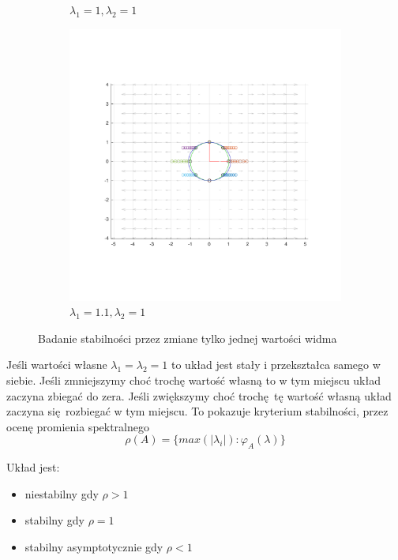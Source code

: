 \documentclass[]{article}
\begin{document}
\begin{figure}[H]
\begin{subfigure}{.5\textwidth}
		\caption{$\lambda_1 = 1, \lambda_2 = 1 $}
		\label{fig:const2}
	\end{subfigure}%
	\begin{subfigure}{.5\textwidth}
		\centering
		\includegraphics[width=0.99\linewidth]{const_11}
		\caption{$\lambda_1 = 1.1, \lambda_2 = 1 $}
		\label{fig:const3}
	\end{subfigure}%
	\caption{Badanie stabilności przez zmiane tylko jednej wartości widma}
	\label{figcons2}
\end{figure}

Jeśli wartości własne $ \lambda_1 = \lambda_2 = 1 $ to układ jest stały i przekształca samego w siebie. Jeśli zmniejszymy choć trochę wartość własną to w tym miejscu układ zaczyna zbiegać do zera. Jeśli zwiększymy choć trochę tę wartość własną układ zaczyna się rozbiegać w tym miejscu. To pokazuje kryterium stabilności, przez ocenę promienia spektralnego \[ \rho(A) = \{max (|\lambda_i|) : \varphi_A(\lambda)\} \]

Układ jest:
\begin{itemize}
	\item niestabilny gdy $\rho > 1 $
	\item stabilny gdy $\rho = 1 $
	\item stabilny asymptotycznie gdy $\rho < 1 $
\end{itemize}
\end{document}
